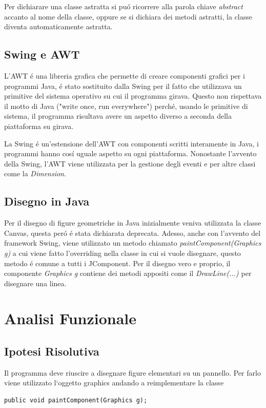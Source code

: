 \documentclass[a4paper,12pt,times,numbered,print,index]{article}
\begin{document}
Per dichiarare una classe astratta si puó ricorrere alla parola chiave \textit{abstract} accanto al nome della classe, oppure se si dichiara dei metodi astratti, la classe diventa automaticamente astratta.
\textcite{astratta}

\subsection{Swing e AWT}
L'AWT é una libreria grafica che permette di creare componenti grafici per i programmi Java, é stato sostituito dalla Swing per il fatto che utilizzava un primitive del sistema operativo su cui il programma girava. Questo non rispettava il motto di Java ("write once, run everywhere") perché, usando le primitive di sistema, il programma risultava avere un aspetto diverso a seconda della piattaforma su girava.

La Swing é un'estensione dell'AWT con componenti scritti interamente in Java, i programmi hanno cosí uguale aspetto su ogni piattaforma. Nonostante l'avvento della Swing, l'AWT viene utilizzata per la gestione degli eventi e per altre classi come la \textit{Dimension}.

\subsection{Disegno in Java}
Per il disegno di figure geometriche in Java inizialmente veniva utilizzata la classe Canvas, questa peró é stata dichiarata deprecata. Adesso, anche con l'avvento del framework Swing, viene utilizzato un metodo chiamato \textit{paintComponent(Graphics g)} a cui viene fatto l'overriding nella classe in cui si vuole disegnare, questo metodo é comune a tutti i JComponent. Per il disegno vero e proprio, il componente \textit{Graphics g} contiene dei metodi appositi come il \textit{DrawLine(...)} per disegnare una linea. 

\section{Analisi Funzionale}


\subsection{Ipotesi Risolutiva}
Il programma deve riuscire a disegnare figure elementari su un pannello. Per farlo viene utilizzato l`oggetto graphics andando a reimplementare la classe 
\begin{lstlisting}
public void paintComponent(Graphics g);
\end{lstlisting}
\end{document}
